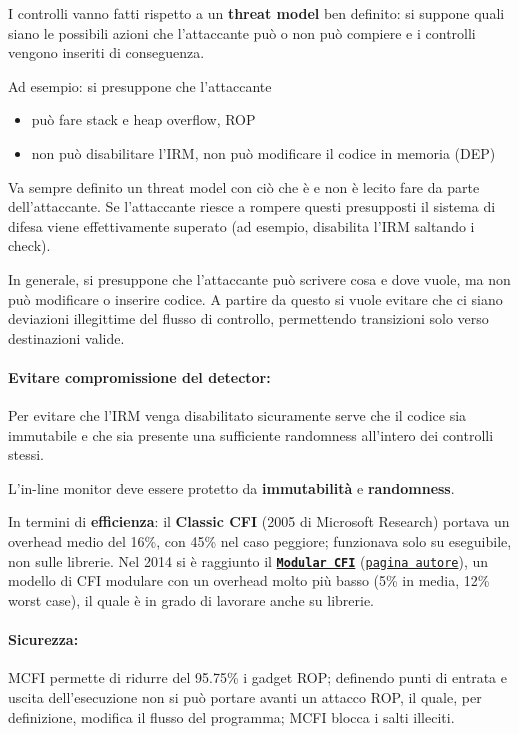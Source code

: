 I controlli vanno fatti rispetto a un \textbf{threat model} ben definito: si suppone quali siano le possibili azioni che l'attaccante può o non può compiere e i controlli vengono inseriti di conseguenza. 

Ad esempio: si presuppone che l'attaccante 
\begin{itemize}
	\item può fare stack e heap overflow, ROP
    
	\item non può disabilitare l'IRM, non può modificare il codice in memoria (DEP)
\end{itemize}

Va sempre definito un threat model con ciò che è e non è lecito fare da parte dell'attaccante. Se l'attaccante riesce a rompere questi presupposti il sistema di difesa viene effettivamente superato (ad esempio, disabilita l'IRM saltando i check).

In generale, si presuppone che l'attaccante può scrivere cosa e dove vuole, ma non può modificare o inserire codice. A partire da questo si vuole evitare che ci siano deviazioni illegittime del flusso di controllo, permettendo transizioni solo verso destinazioni valide.

\paragraph{Evitare compromissione del detector:} Per evitare che l'IRM venga disabilitato sicuramente serve che il codice sia immutabile e che sia presente una sufficiente randomness all'intero dei controlli stessi. 

L'in-line monitor deve essere protetto da \textbf{immutabilità} e \textbf{randomness}.

In termini di \textbf{efficienza}: il \textbf{Classic CFI} (2005 di Microsoft Research) portava un overhead medio del 16\%, con 45\% nel caso peggiore; funzionava solo su eseguibile, non sulle librerie. Nel 2014 si è raggiunto il \href{https://www.cse.psu.edu/~gxt29/papers/mcfi.pdf}{\textbf{\texttt{Modular CFI}}} (\href{https://www.cse.psu.edu/~gxt29/}{\texttt{pagina autore}}), un modello di CFI modulare con un overhead molto più basso (5\% in media, 12\% worst case), il quale è in grado di lavorare anche su librerie.

\paragraph{Sicurezza:} MCFI permette di ridurre del 95.75\% i gadget ROP; definendo punti di entrata e uscita dell'esecuzione non si può portare avanti un attacco ROP, il quale, per definizione, modifica il flusso del programma; MCFI blocca i salti illeciti. 

